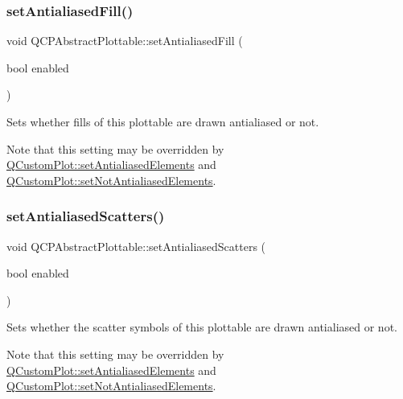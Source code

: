 \mbox{\label{class_q_c_p_abstract_plottable_a089d6b5577120239b55c39ed27c39536}} 
\subsubsection{\texorpdfstring{set\+Antialiased\+Fill()}{setAntialiasedFill()}}
{\footnotesize\ttfamily void Q\+C\+P\+Abstract\+Plottable\+::set\+Antialiased\+Fill (\begin{DoxyParamCaption}\item[{bool}]{enabled }\end{DoxyParamCaption})}

Sets whether fills of this plottable are drawn antialiased or not.

Note that this setting may be overridden by \hyperlink{class_q_custom_plot_af6f91e5eab1be85f67c556e98c3745e8}{Q\+Custom\+Plot\+::set\+Antialiased\+Elements} and \hyperlink{class_q_custom_plot_ae10d685b5eabea2999fb8775ca173c24}{Q\+Custom\+Plot\+::set\+Not\+Antialiased\+Elements}. \mbox{\label{class_q_c_p_abstract_plottable_a2f03f067ede2ed4da6f7d0e4777a3f02}} 
\subsubsection{\texorpdfstring{set\+Antialiased\+Scatters()}{setAntialiasedScatters()}}
{\footnotesize\ttfamily void Q\+C\+P\+Abstract\+Plottable\+::set\+Antialiased\+Scatters (\begin{DoxyParamCaption}\item[{bool}]{enabled }\end{DoxyParamCaption})}

Sets whether the scatter symbols of this plottable are drawn antialiased or not.

Note that this setting may be overridden by \hyperlink{class_q_custom_plot_af6f91e5eab1be85f67c556e98c3745e8}{Q\+Custom\+Plot\+::set\+Antialiased\+Elements} and \hyperlink{class_q_custom_plot_ae10d685b5eabea2999fb8775ca173c24}{Q\+Custom\+Plot\+::set\+Not\+Antialiased\+Elements}. \mbox{\label{class_q_c_p_abstract_plottable_a7a4b92144dca6453a1f0f210e27edc74}} 
